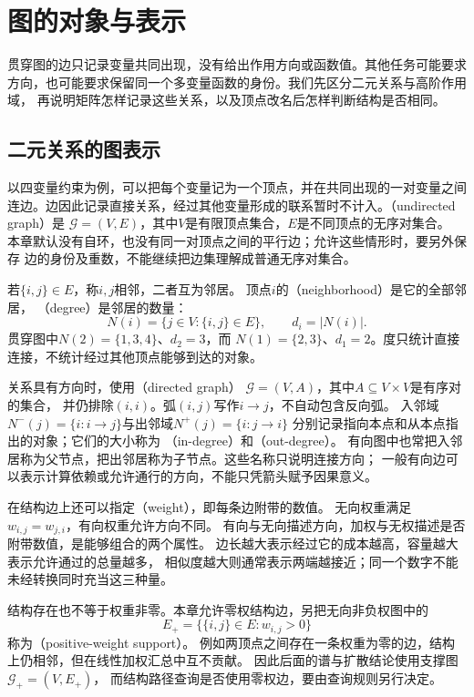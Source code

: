 \section{图的对象与表示}
\label{sec:graph-theory-objects-representations}

贯穿图的边只记录变量共同出现，没有给出作用方向或函数值。其他任务可能要求
方向，也可能要求保留同一个多变量函数的身份。我们先区分二元关系与高阶作用域，
再说明矩阵怎样记录这些关系，以及顶点改名后怎样判断结构是否相同。

\subsection{二元关系的图表示}
\label{sec:graph-theory-local-relations}
\label{sec:graph-theory-binary-relations}

以四变量约束为例，可以把每个变量记为一个顶点，并在共同出现的一对变量之间
连边。边因此记录直接关系，经过其他变量形成的联系暂时不计入。（undirected graph）是
\(\mathcal G=(V,E)\)，其中\(V\)是有限顶点集合，\(E\)是不同顶点的无序对集合。
本章默认没有自环，也没有同一对顶点之间的平行边；允许这些情形时，要另外保存
边的身份及重数，不能继续把边集理解成普通无序对集合。

若\(\{i,j\}\in E\)，称\(i,j\)相邻，二者互为邻居。
顶点\(i\)的（neighborhood）是它的全部邻居，
（degree）是邻居的数量：
\[
  N(i)=\{j\in V:\{i,j\}\in E\},\qquad d_i=|N(i)|.
\]
贯穿图中\(N(2)=\{1,3,4\}\)、\(d_2=3\)，而
\(N(1)=\{2,3\}\)、\(d_1=2\)。度只统计直接连接，不统计经过其他顶点能够到达的对象。

关系具有方向时，使用（directed graph）
\(\mathcal G=(V,A)\)，其中\(A\subseteq V\times V\)是有序对的集合，
并仍排除\((i,i)\)。弧\((i,j)\)写作\(i\to j\)，不自动包含反向弧。
入邻域\(N^-(j)=\{i:i\to j\}\)与出邻域\(N^+(j)=\{i:j\to i\}\)
分别记录指向本点和从本点指出的对象；它们的大小称为
（in-degree）和（out-degree）。
有向图中也常把入邻居称为父节点，把出邻居称为子节点。这些名称只说明连接方向；
一般有向边可以表示计算依赖或允许通行的方向，不能只凭箭头赋予因果意义。

在结构边上还可以指定（weight），即每条边附带的数值。
无向权重满足\(w_{i,j}=w_{j,i}\)，有向权重允许方向不同。
有向与无向描述方向，加权与无权描述是否附带数值，是能够组合的两个属性。
边长越大表示经过它的成本越高，容量越大表示允许通过的总量越多，
相似度越大则通常表示两端越接近；同一个数字不能未经转换同时充当这三种量。

结构存在也不等于权重非零。本章允许零权结构边，另把无向非负权图中的
\[
  E_+=\{\{i,j\}\in E:w_{i,j}>0\}
\]
称为（positive-weight support）。
例如两顶点之间存在一条权重为零的边，结构上仍相邻，但在线性加权汇总中互不贡献。
因此后面的谱与扩散结论使用支撑图\(\mathcal G_+=(V,E_+)\)，
而结构路径查询是否使用零权边，要由查询规则另行决定。

